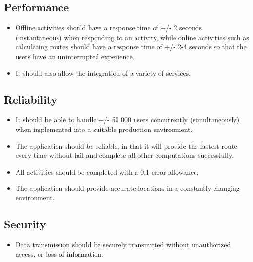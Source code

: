 \subsection{Performance}
\begin{itemize}
\item Offline activities should have a response time of +/- 2 seconds (instantaneous) when responding to an activity, while online activities such as calculating routes should have a response time of +/- 2-4 seconds so that the users have an uninterrupted experience.\\
\item It should also allow the integration of a variety of services.\\
\end{itemize}
\subsection{Reliability} 
\begin{itemize}
\item It should be able to handle +/- 50 000 users concurrently (simultaneously) when implemented into a suitable production environment. \\
 \item The application should be reliable, in that it will provide the fastest route every time without fail and complete all other computations successfully. \\
\item All activities should be completed with a 0.1 error allowance.\\
\item The application should provide accurate locations in a constantly changing environment.\\
\end{itemize}
\subsection{Security}
\begin{itemize}
\item Data transmission should be securely transmitted without unauthorized access, or loss of information.\\
\end{itemize}
